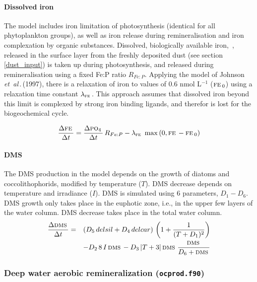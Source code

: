 \documentclass[11pt,a4paper,fleqn,twoside]{article}
\def\pho{\text{\textsc{po$_4$}}\,}
\def\dms{\text{\textsc{dms}}\,}
\def\fe{\text{\textsc{fe}}\,}
\def\dms{\text{\textsc{dms}}\,}
\newcommand{\etal}{{\em et~al\,}.\,}
\begin{document}
\paragraph{Dissolved iron}   The model includes iron limitation of
photosynthesis (identical for all phytoplankton groups), 
as well as iron release during remineralisation and iron
complexation by organic substances.  Dissolved, biologically available iron,
\fe,  released in the surface layer from the freshly deposited dust 
(see section \ref{dust_input}) is taken up during
photosynthesis, and released during remineralisation using a fixed Fe:P ratio
$R_{Fe:P}$.  Applying the model of Johnson \etal (1997)\nocite{johnson:1997},
there is a relaxation of iron to values of 0.6 nmol L$^{-1}$ ($\fe_0$) using a
relaxation time constant $\lambda_{\fe}$. This approach assumes that dissolved
iron beyond this limit is complexed by strong iron binding ligands, and 
therefor is lost for the biogeochemical cycle.

\begin{equation}
\frac{\Delta  \fe}{\Delta  t} = \frac{\Delta  \pho}{\Delta  t}\, R_{Fe:P} - \lambda_\fe \, \max \left(0,\fe-\fe_0 \right)
\end{equation}

\paragraph{DMS} The DMS production in the model depends on the growth of
diatoms and coccolithophorids, modified by temperature ($T$). DMS decrease
depends on temperature and irradiance ($I$). DMS is simulated using 6 parameters,
$D_1 - D_6$. DMS growth only takes place in the euphotic zone, i.e., in the upper few
layers of the water column. DMS decrease takes place in the total water column.
\begin{eqnarray}
\frac{\Delta  \dms}{\Delta  t} & = & \left( D_5 \, delsil + D_4 \, delcar \right)
            \, \left( 1+\frac{1}{(T+D_1)^2} \right) \\
        & &     - D_2 \, 8 \, I \,\dms \nonumber
             -  D_3\, |T+3| \,\dms \, \frac{\dms}{D_6 + \dms} \nonumber
\end{eqnarray}

\subsubsection{\label{deep_aerobic_remineralization}Deep water aerobic
remineralization  ({\tt ocprod.f90})} 
\end{document}
